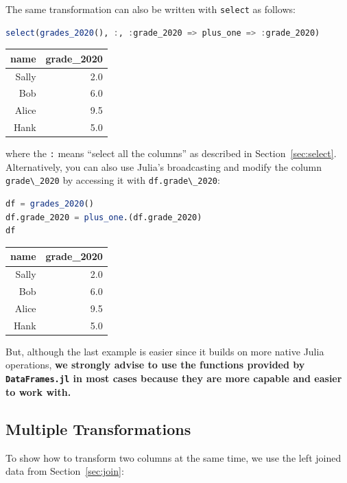 \documentclass[
  notoc %
]{tufte-book}
\newcommand{\passthrough}[1]{#1}
\begin{document}
The same transformation can also be written with
\passthrough{\lstinline!select!} as follows:

\begin{lstlisting}[language=Julia]
select(grades_2020(), :, :grade_2020 => plus_one => :grade_2020)
\end{lstlisting}

\begin{longtable}[]{@{}rr@{}}
\toprule
name & grade\_2020 \\
\midrule
\endhead
Sally & 2.0 \\
Bob & 6.0 \\
Alice & 9.5 \\
Hank & 5.0 \\
\bottomrule
\end{longtable}

where the \passthrough{\lstinline!:!} means ``select all the columns''
as described in Section~\ref{sec:select}. Alternatively, you can also
use Julia's broadcasting and modify the column
\passthrough{\lstinline!grade\_2020!} by accessing it with
\passthrough{\lstinline!df.grade\_2020!}:

\begin{lstlisting}[language=Julia]
df = grades_2020()
df.grade_2020 = plus_one.(df.grade_2020)
df
\end{lstlisting}

\begin{longtable}[]{@{}rr@{}}
\toprule
name & grade\_2020 \\
\midrule
\endhead
Sally & 2.0 \\
Bob & 6.0 \\
Alice & 9.5 \\
Hank & 5.0 \\
\bottomrule
\end{longtable}

But, although the last example is easier since it builds on more native
Julia operations, \textbf{we strongly advise to use the functions
provided by \passthrough{\lstinline!DataFrames.jl!} in most cases
because they are more capable and easier to work with.}

\hypertarget{sec:multiple_transform}{%
\subsection{Multiple Transformations}\label{sec:multiple_transform}}

To show how to transform two columns at the same time, we use the left
joined data from Section~\ref{sec:join}:
\end{document}
